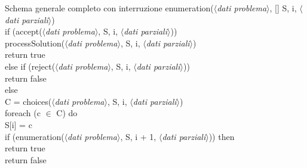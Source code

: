 \begin{minicode}{Schema generale completo con interruzione}
\ind{} enumeration($\langle$\emph{dati problema}$\rangle$, [] S,
     i, $\langle$\emph{dati parziali}$\rangle$)\\
    \indf if (accept($\langle$\emph{dati problema}$\rangle$, S, i,
        $\langle$\emph{dati parziali}$\rangle$))\\
        processSolution($\langle$\emph{dati problema}$\rangle$, S, i,
        $\langle$\emph{dati parziali}$\rangle$)\\
        return true\\
    \indf{}
    \indf else if (reject($\langle$\emph{dati problema}$\rangle$, S, i,
    $\langle$\emph{dati parziali}$\rangle$))\\
        return false\\
    \indf else\\
         C = choices($\langle$\emph{dati problema}$\rangle$, S, i,
        $\langle$\emph{dati parziali}$\rangle$)\\
        \indff foreach (c $\in$ C) do\\
            S[i] = c\\
            \indfff if (enumeration($\langle$\emph{dati problema}$\rangle$, S, i + 1,
            $\langle$\emph{dati parziali}$\rangle$)) then\\
                return true\\
        \indff return false
\end{minicode}

